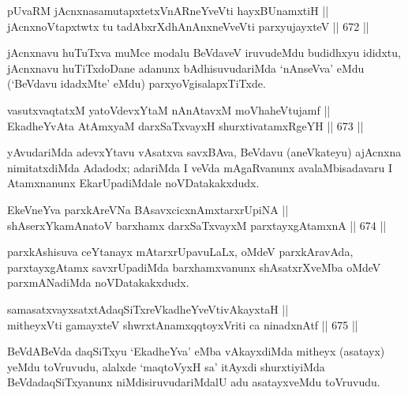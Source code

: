 
\begin{shl}
pUvaRM jAcnxnasamutapxtetxVnARneYveVti hayxBUnamxtiH || \\
jAcnxnoVtapxtwtx tu tadAbxrXdhAnAnxneVveVti parxyujayxteV \hfill || 672 ||  
\end{shl}

\begin{artha} 
jAcnxnavu huTuTxva muMce modalu BeVdaveV iruvudeMdu budidhxyu ididxtu, 
jAcnxnavu huTiTxdoDane adanunx bAdhisuvudariMda `nAnseVva' eMdu 
(`BeVdavu idadxMte' eMdu) parxyoVgisalapxTiTxde.
\end{artha}


\begin{shl}
vasutxvaqtatxM yatoV\s devxYtaM nAnAtavxM moVhaheVtujamf || \\
EkadheYvAta AtAmx\s yaM darxSaTxvayxH shurxtivatamxRgeYH \hfill || 673 ||  
\end{shl}

\begin{artha} 
yAvudariMda adevxYtavu vAsatxva savxBAva, BeVdavu (aneVkateyu) 
ajAcnxna nimitatxdiMda Adadodx; adariMda I veVda mAgaRvanunx 
avalaMbisadavaru I Atamxnanunx EkarUpadiMdale noVDatakakxdudx.
\end{artha}

\begin{shl}
EkeVneYva parxkAreVNa BAsavxcicxnAmxtarxrUpiNA || \\
shAserxYkamAnatoV barxhamx darxSaTxvayxM parxtayxgAtamxnA \hfill || 674 ||  
\end{shl}

\begin{artha} 
parxkAshisuva ceYtanayx mAtarxrUpavuLaLx, oMdeV parxkAravAda, 
parxtayxgAtamx savxrUpadiMda barxhamxvanunx shAsatxrXveMba oMdeV 
parxmANadiMda noVDatakakxdudx.
\end{artha}


\begin{shl}
samasatxvayxsatxtAdaqSiTxreVkadheYveVtivAkayxtaH || \\
mitheyxVti gamayxteV shwrxtAnamxqqtoyxVriti ca ninadxnAtf \hfill || 675 ||  
\end{shl}

\begin{artha} 
BeVdABeVda daqSiTxyu `EkadheYva' eMba vAkayxdiMda mitheyx (asatayx) 
yeMdu toVruvudu, alalxde `maqtoVyxH sa' itAyxdi shurxtiyiMda 
BeVdadaqSiTxyanunx niMdisiruvudariMdalU adu asatayxveMdu toVruvudu.
\end{artha}

